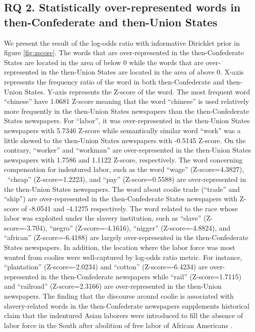 \documentclass[11pt]{article}
\begin{document}
\subsection{RQ 2. Statistically over-represented words in then-Confederate and then-Union States} \label{sec:result_rq2_overrepresented_words}

We present the result of the log-odds ratio with informative Dirichlet prior in figure \ref{fig:zscore}.
The words that are over-represented in the then-Confederate States are located in the area of below 0 while 
the words that are over-represented in the then-Union States are located in the area of above 0. X-axis represents
the frequency ratio of the word in both then-Confederate and then-Union States. Y-axis represents the Z-score of the word.
The most frequent word ``chinese'' have 1.0681 Z-score meaning that the word ``chinese'' is used relatively
more frequently in the then-Union States newspapers than the then-Confederate States newspapers.
For ``labor'', it was over-represented in the then-Union States newspapers with 5.7346 Z-score while
semantically similar word ``work'' was a little skewed to the then-Union States newspapers with -0.5145 Z-score. 
On the contrary, ``worker'' and ``workman'' are over-represented in the then-Union States newspapers with
1.7586 and 1.1122 Z-score, respectively.
The word concerning compensation for indentured labor, such as the word ``wage'' (Z-score=4.3827), \
``cheap'' (Z-score=1.2223), and ``pay'' (Z-score=0.5588) are over-represented in the then-Union States newspapers.
The word about coolie trade (``trade'' and ``ship'') are over-represented in the then-Confederate States newspapers with
Z-score of -8.0541 and -4.1275 respectively.
The word related to the race whose labor was exploited under the slavery institution, such as 
``slave'' (Z-score=-3.704), ``negro'' (Z-score=-4.1616), ``nigger'' (Z-score=-4.8824), and ``african'' (Z-score=-6.4188) are largely over-represented 
in the then-Confederate States newspapers. In addition, the location where the labor force was most wanted from coolies
were well-captured by log-odds ratio metric. For instance, ``plantation'' (Z-score=-2.0234) and 
``cotton'' (Z-score=-6.4234) are over-represented
in the then-Confederate newspapers while ``rail'' (Z-score=1.7115) and ``railroad'' (Z-score=2.3166) are over-represented in the then-Union newspapers.
The finding that the discourse around coolie is associated with slavery-related words in the then-Confederate newspapers 
supplements historical claim that the indentured Asian laborers were introduced to fill the absence of labor force in the South after abolition
of free labor of African Americans \cite{van2016coolie}.
\end{document}
